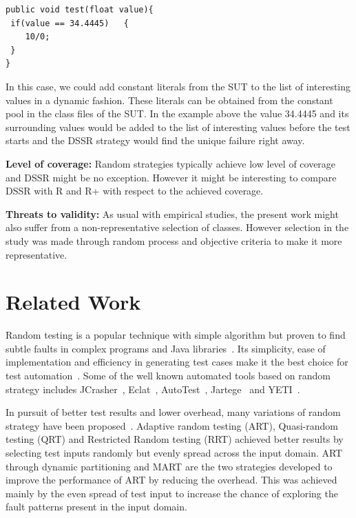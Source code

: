 \begin{lstlisting}
public void test(float value){
 if(value == 34.4445)   {
 	10/0;
 }
}
\end{lstlisting}

In this case, we could add constant literals from the SUT to the list of interesting values in a dynamic fashion. These literals can be obtained from the constant pool in the class files of the SUT. In the example above the value 34.4445 and its surrounding values would  be added to the list of interesting values before the test starts and the DSSR strategy would find the unique failure right away.

\textbf{Level of coverage:} Random strategies typically achieve low level of coverage~\cite{oriol2010yeti} and DSSR might be no exception. However it might be interesting to compare DSSR with R and R+ with respect to the achieved coverage.

\textbf{Threats to validity:} As usual with empirical studies, the present work might also suffer from a non-representative selection of classes. However selection in the study was made through random process and objective criteria to make it more representative.




\section{Related Work}\label{sec:rw}

Random testing is a popular technique with simple algorithm but proven to find subtle faults in complex programs and Java libraries~\cite{csallner2004jcrasher, pacheco2005eclat,claessen2011quickcheck}. Its simplicity, ease of implementation and efficiency in generating test cases make it the best choice for test automation~\cite{hamlet1994random}. Some of the well known automated tools based on random strategy includes JCrasher~\cite{csallner2004jcrasher}, Eclat~\cite{pacheco2005eclat}, AutoTest~\cite{ciupa2007experimental, ciupa2008artoo}, Jartege~\cite{oriat2005jartege} and YETI~\cite{oriol2010yeti, oriol2012random}.

In pursuit of better test results and lower overhead, many variations of random strategy have been proposed~\cite{chen2004mirror, chen2007quasi, chen2010adaptive, chan2006restricted, chen2004adaptive}. Adaptive random testing (ART), Quasi-random testing (QRT) and Restricted Random testing (RRT) achieved better results by selecting test inputs randomly but evenly spread across the input domain. ART through dynamic partitioning and MART are the two strategies developed to improve the performance of ART by reducing the overhead. This was achieved mainly by the even spread of test input to increase the chance of exploring the fault patterns present in the input domain.

